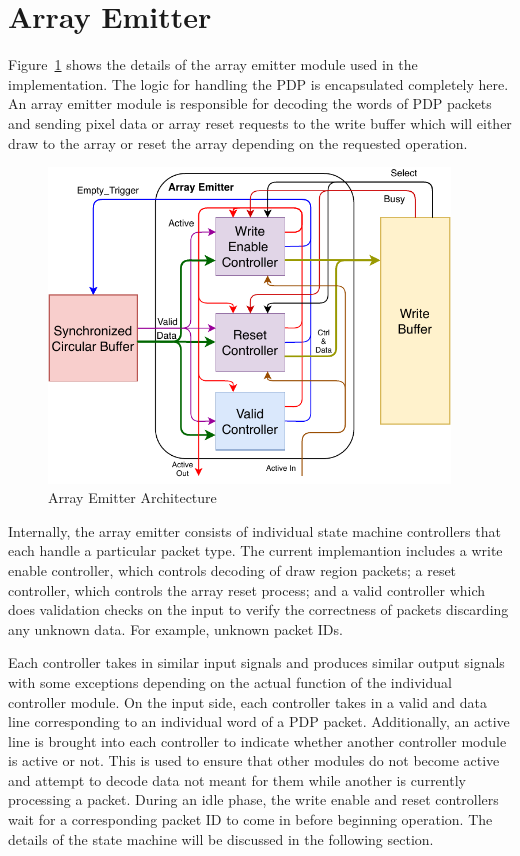 
\section{Array Emitter}

    Figure~\ref{fig:ae_arch} shows the details of the array emitter module used in the implementation. The logic for handling the PDP is encapsulated completely here. An array emitter module is responsible for decoding the words of PDP packets and sending pixel data or array reset requests to the write buffer which will either draw to the array or reset the array depending on the requested operation.

    \begin{figure}[t]
        \centering
        \includegraphics[width=0.95\textwidth]{fig/pdp_ae_arch.pdf}
        \caption{Array Emitter Architecture}
        \label{fig:ae_arch}
    \end{figure}

    Internally, the array emitter consists of individual state machine controllers that each handle a particular packet type. The current implemantion includes a write enable controller, which controls decoding of draw region packets; a reset controller, which controls the array reset process; and a valid controller which does validation checks on the input to verify the correctness of packets discarding any unknown data. For example, unknown packet IDs.

    Each controller takes in similar input signals and produces similar output signals with some exceptions depending on the actual function of the individual controller module. On the input side, each controller takes in a valid and data line corresponding to an individual word of a PDP packet. Additionally, an active line is brought into each controller to indicate whether another controller module is active or not. This is used to ensure that other modules do not become active and attempt to decode data not meant for them while another is currently processing a packet. During an idle phase, the write enable and reset controllers wait for a corresponding packet ID to come in before beginning operation. The details of the state machine will be discussed in the following section.

